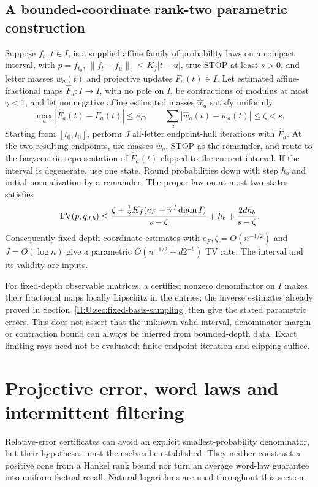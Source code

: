 \subsection{A bounded-coordinate rank-two parametric construction}
\label{II:U:sec:parametric-rank-two}
\begin{theorem}
\label{II:U:thm:parametric-rank-two}
Suppose $f_t$, $t\in I$, is a supplied affine family of probability
laws on a compact interval, with $p=f_{t_0}$,
$\|f_t-f_u\|_1\le K_f|t-u|$, true STOP at least $s>0$, and
letter masses $w_a(t)$ and projective updates $F_a(t)\in I$.
Let estimated affine-fractional maps $\widehat F_a:I\to I$, with
no pole on $I$, be contractions of modulus
at most $\bar\gamma<1$, and let nonnegative affine estimated masses
$\widehat w_a$ satisfy uniformly
\[
 \max_a|\widehat F_a(t)-F_a(t)|\le e_F,
 \qquad \sum_a|\widehat w_a(t)-w_a(t)|\le\zeta<s.
\]
Starting from $[t_0,t_0]$, perform $J$ all-letter endpoint-hull
iterations with $\widehat F_a$. At the two resulting endpoints,
use masses $\widehat w_a$, STOP as the remainder, and route to the
barycentric representation of $\widehat F_a(t)$ clipped to the
current interval. If the interval is degenerate, use one state.
Round probabilities down with step $h_b$ and initial normalization
by a remainder. The proper law on at most two states satisfies
\begin{equation}
 \operatorname{TV}(p,q_{J,b})\le
 \frac{\zeta+\frac12K_f(e_F+\bar\gamma^J\operatorname{diam}I)}{s-\zeta}
       +h_b+\frac{2dh_b}{s-\zeta}.
 \label{II:U:eq:parametric-rank-two}
\end{equation}
Consequently fixed-depth coordinate estimates with
$e_F,\zeta=O(n^{-1/2})$ and $J=O(\log n)$ give a parametric
$O(n^{-1/2}+d2^{-b})$ TV rate. The interval and its validity are inputs.
\end{theorem}

For fixed-depth observable matrices, a certified nonzero denominator
on $I$ makes their fractional maps locally Lipschitz in the entries;
the inverse estimates already proved in Section~\ref{II:U:sec:fixed-basis-sampling}
then give the stated parametric errors. This does not assert that
the unknown valid interval, denominator margin or contraction bound
can always be inferred from bounded-depth data. Exact limiting rays
need not be evaluated: finite endpoint iteration and clipping suffice.

\section{Projective error, word laws and intermittent filtering}
\label{II:M:sec:projective-certificates}
Relative-error certificates can avoid an explicit
smallest-probability denominator, but their hypotheses must themselves
be established. They neither construct a positive cone from a Hankel
rank bound nor turn an average word-law guarantee into uniform factual
recall. Natural logarithms are used throughout this section.

